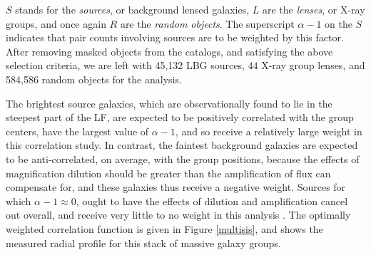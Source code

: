 $S$ stands for the {\it sources}, or background lensed galaxies, $L$ are the {\it lenses}, or X-ray groups, and once again $R$ are the {\it random objects}. The superscript $\alpha-1$ on the $S$ indicates that pair counts involving sources are to be weighted by this factor.  After removing masked objects from the catalogs, and satisfying the above selection criteria, we are left with 45,132 \ac{LBG} sources, $44$ X-ray group lenses, and 584,586 random objects for the analysis.

\begin{table}
  \begin{center}


   \caption[Luminosity Function Parameters]{\ac{LF} (Schechter) parameters from external \ac{LBG} measurements. $^a$ \ac{LF} parameters from \protect \citet{vanderBurg10}. $^b$ \ac{LF} parameters from \protect \citet{Sawicki06}.}
 \label{LFtable}
  \end{center}
\end{table}


The brightest source galaxies, which are observationally found to lie in the steepest part of the \ac{LF}, are expected to be positively correlated with the group centers, have the largest value of $\alpha-1$, and so receive a relatively large weight in this correlation study.  In contrast, the faintest background galaxies are expected to be anti-correlated, on average, with the group positions, because the effects of magnification dilution should be greater than the amplification of flux can compensate for, and these galaxies thus receive a negative weight.  Sources for which $\alpha-1 \approx 0$, ought to have the effects of dilution and amplification cancel out overall, and receive very little to no weight in this analysis \citep{Scranton05}. The optimally weighted correlation function is given in Figure \ref{multisis}, and shows the measured radial profile for this stack of massive galaxy groups.


